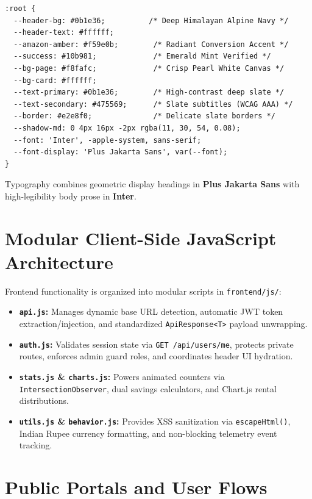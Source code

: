 \begin{lstlisting}[language=HTML, caption={Core Design Tokens in frontend/css/global.css}, label={lst:design_tokens}]
:root {
  --header-bg: #0b1e36;          /* Deep Himalayan Alpine Navy */
  --header-text: #ffffff;
  --amazon-amber: #f59e0b;        /* Radiant Conversion Accent */
  --success: #10b981;             /* Emerald Mint Verified */
  --bg-page: #f8fafc;             /* Crisp Pearl White Canvas */
  --bg-card: #ffffff;
  --text-primary: #0b1e36;        /* High-contrast deep slate */
  --text-secondary: #475569;      /* Slate subtitles (WCAG AAA) */
  --border: #e2e8f0;              /* Delicate slate borders */
  --shadow-md: 0 4px 16px -2px rgba(11, 30, 54, 0.08);
  --font: 'Inter', -apple-system, sans-serif;
  --font-display: 'Plus Jakarta Sans', var(--font);
}
\end{lstlisting}

Typography combines geometric display headings in \textbf{Plus Jakarta Sans} with high-legibility body prose in \textbf{Inter}.

\section{Modular Client-Side JavaScript Architecture}
Frontend functionality is organized into modular scripts in \texttt{frontend/js/}:
\begin{itemize}
    \item \textbf{\texttt{api.js}:} Manages dynamic base URL detection, automatic JWT token extraction/injection, and standardized \texttt{ApiResponse<T>} payload unwrapping.
    \item \textbf{\texttt{auth.js}:} Validates session state via \texttt{GET /api/users/me}, protects private routes, enforces admin guard roles, and coordinates header UI hydration.
    \item \textbf{\texttt{stats.js} \& \texttt{charts.js}:} Powers animated counters via \texttt{IntersectionObserver}, dual savings calculators, and Chart.js rental distributions.
    \item \textbf{\texttt{utils.js} \& \texttt{behavior.js}:} Provides XSS sanitization via \texttt{escapeHtml()}, Indian Rupee currency formatting, and non-blocking telemetry event tracking.
\end{itemize}

\section{Public Portals and User Flows}

